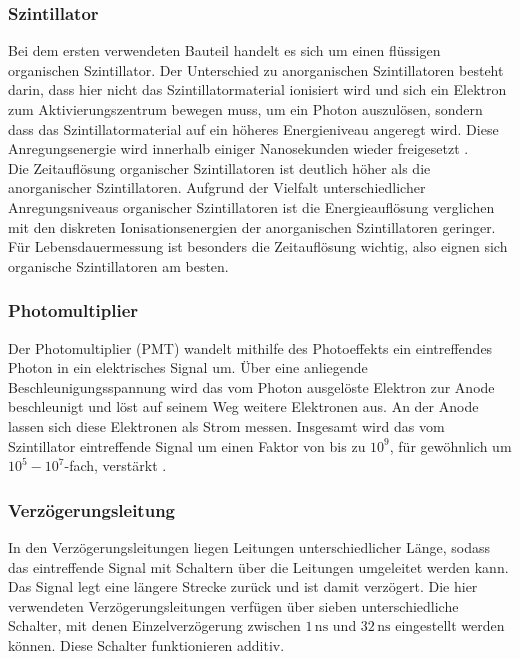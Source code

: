 \subsubsection{Szintillator}

Bei dem ersten verwendeten Bauteil handelt es sich um einen flüssigen organischen Szintillator. Der Unterschied zu anorganischen Szintillatoren besteht darin, dass hier nicht das Szintillatormaterial
ionisiert wird und sich ein Elektron zum Aktivierungszentrum bewegen muss, um ein Photon auszulösen, sondern dass das Szintillatormaterial auf ein höheres Energieniveau angeregt wird.
Diese Anregungsenergie wird innerhalb einiger Nanosekunden wieder freigesetzt \cite{kolawerm}. \\
Die Zeitauflösung organischer Szintillatoren ist deutlich höher als die anorganischer Szintillatoren.
Aufgrund der Vielfalt unterschiedlicher Anregungsniveaus organischer Szintillatoren ist die Energieauflösung verglichen mit den diskreten Ionisationsenergien der anorganischen Szintillatoren geringer.
Für Lebensdauermessung ist besonders die Zeitauflösung wichtig, also eignen sich organische Szintillatoren am besten. \\


\subsubsection{Photomultiplier}

Der Photomultiplier (PMT) wandelt mithilfe des Photoeffekts ein eintreffendes Photon in ein elektrisches Signal um.
Über eine anliegende Beschleunigungsspannung wird das vom Photon ausgelöste Elektron zur Anode beschleunigt und löst auf seinem Weg weitere Elektronen aus.
An der Anode lassen sich diese Elektronen als Strom messen.
Insgesamt wird das vom Szintillator eintreffende Signal um einen Faktor von bis zu $10^9$, für gewöhnlich um $10^5 - 10^7$-fach, verstärkt \cite{kolawerm}.


\subsubsection{Verzögerungsleitung}

In den Verzögerungsleitungen liegen Leitungen unterschiedlicher Länge, sodass das eintreffende Signal mit Schaltern über die Leitungen umgeleitet werden kann.
Das Signal legt eine längere Strecke zurück und ist damit verzögert. Die hier verwendeten Verzögerungsleitungen verfügen über sieben unterschiedliche Schalter, mit denen Einzelverzögerung
zwischen $1 \,\unit{\nano\second}$ und $32 \,\unit{\nano\second}$ eingestellt werden können. Diese Schalter funktionieren additiv.


